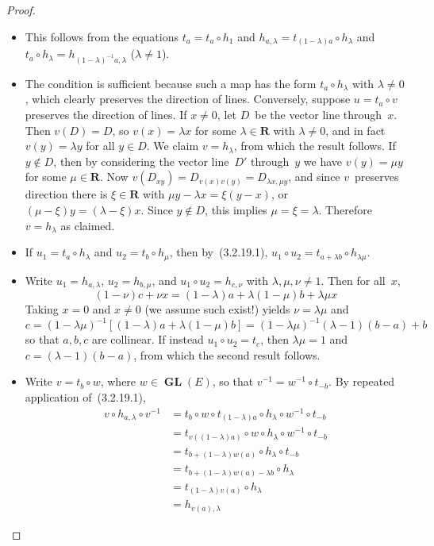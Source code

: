 \documentclass[letterpaper,12pt]{article}
\newcommand{\R}{\mathbf{R}}
\newcommand{\after}{\circ}
\DeclareMathOperator{\GL}{\mathbf{GL}}
\newcommand{\inv}[1]{#1^{-1}}
\theoremstyle{definition}
\theoremstyle{remark}
\begin{document}
\begin{proof}\
\begin{itemize}[itemsep=0pt]
\item This follows from the equations \(t_a=t_a\after h_1\) and \(h_{a,\lambda}=t_{(1-\lambda)a}\after h_{\lambda}\) and \(t_a\after h_{\lambda}=h_{(1-\lambda)^{-1}a,\lambda}\) (\(\lambda\ne 1\)).

\item The condition is sufficient because such a map has the form \(t_a\after h_{\lambda}\) with \(\lambda\ne 0\), which clearly preserves the direction of lines. Conversely, suppose \(u=t_a\after v\) preserves the direction of lines. If \(x\ne 0\), let \(D\)~be the vector line through~\(x\). Then \(v(D)=D\), so \(v(x)=\lambda x\) for some \(\lambda\in\R\) with \(\lambda\ne0\), and in fact \(v(y)=\lambda y\) for all \(y\in D\). We claim \(v=h_{\lambda}\), from which the result follows. If \(y\not\in D\), then by considering the vector line~\(D'\) through~\(y\) we have \(v(y)=\mu y\) for some \(\mu\in\R\). Now \(v(D_{xy})=D_{v(x)v(y)}=D_{\lambda x,\mu y}\), and since \(v\)~preserves direction there is \(\xi\in\R\) with \(\mu y-\lambda x=\xi(y-x)\), or \((\mu-\xi)y=(\lambda-\xi)x\). Since \(y\not\in D\), this implies \(\mu=\xi=\lambda\). Therefore \(v=h_{\lambda}\) as claimed.

\item If \(u_1=t_a\after h_{\lambda}\) and \(u_2=t_b\after h_{\mu}\), then by~(3.2.19.1), \(u_1\after u_2=t_{a+\lambda b}\after h_{\lambda\mu}\).

\item Write \(u_1=h_{a,\lambda}\), \(u_2=h_{b,\mu}\), and \(u_1\after u_2=h_{c,\nu}\) with \(\lambda,\mu,\nu\ne1\). Then for all~\(x\),
\[(1-\nu)c+\nu x=(1-\lambda)a+\lambda(1-\mu)b+\lambda\mu x\]
Taking \(x=0\) and \(x\ne0\) (we assume such exist!) yields \(\nu=\lambda\mu\) and
\[c=(1-\lambda\mu)^{-1}[(1-\lambda)a+\lambda(1-\mu)b]=(1-\lambda\mu)^{-1}(\lambda-1)(b-a)+b\]
so that \(a,b,c\) are collinear. If instead \(u_1\after u_2=t_c\), then \(\lambda\mu=1\) and \(c=(\lambda-1)(b-a)\), from which the second result follows.

\item Write \(v=t_b\after w\), where \(w\in\GL(E)\), so that \(\inv{v}=\inv{w}\after t_{-b}\). By repeated application of~(3.2.19.1),
\begin{align*}
v\after h_{a,\lambda}\after\inv{v}&=t_b\after w\after t_{(1-\lambda)a}\after h_{\lambda}\after\inv{w}\after t_{-b}\\
	&=t_{v((1-\lambda)a)}\after w\after h_{\lambda}\after\inv{w}\after t_{-b}\\
	&=t_{b+(1-\lambda)w(a)}\after h_{\lambda}\after t_{-b}\\
	&=t_{b+(1-\lambda)w(a)-\lambda b}\after h_{\lambda}\\
	&=t_{(1-\lambda)v(a)}\after h_{\lambda}\\
	&=h_{v(a),\lambda}
\end{align*}


\end{itemize}
\end{proof}
\end{document}

